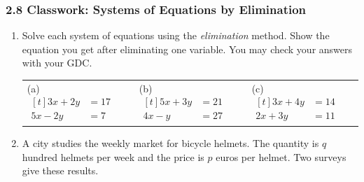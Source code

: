 \documentclass[12pt, twoside]{article}
\begin{document}
\subsubsection*{2.8 Classwork: Systems of Equations by Elimination}

\begin{enumerate}[itemsep=0.15cm]

\item[1.]

Solve each system of equations using the \emph{elimination} method. Show
the equation you get after eliminating one variable. You may check your
answers with your GDC.

\medskip
\begin{tabular}{@{}p{4.9cm}p{4.9cm}p{4.9cm}@{}}
(a) \quad $\begin{aligned}[t]
    3x + 2y &= 17 \\
    5x - 2y &= 7
  \end{aligned}$ &
(b) \quad $\begin{aligned}[t]
    5x + 3y &= 21 \\
    4x - y &= 27
  \end{aligned}$ &
(c) \quad $\begin{aligned}[t]
    3x + 4y &= 14 \\
    2x + 3y &= 11
  \end{aligned}$ \\
\end{tabular}

\medskip
{}

\newpage

\item[2.]

A city studies the weekly market for bicycle helmets. The quantity is $q$
hundred helmets per week and the price is $p$ euros per helmet. Two surveys
give these results.


\end{enumerate}
\end{document}
